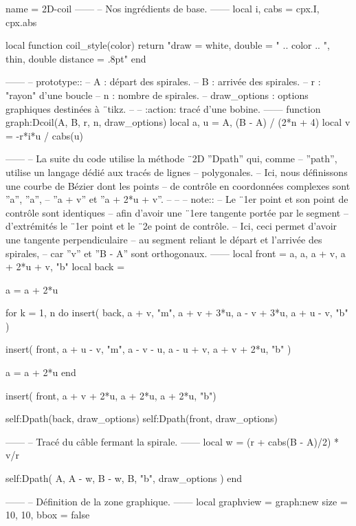 \documentclass[varwidth]{standalone}
\begin{document}
\begin{luadraw}{name = 2D-coil}
------
-- Nos ingrédients de base.
------
local i, cabs = cpx.I, cpx.abs

local function coil_style(color)
  return "draw = white, double = " .. color
      .. ", thin, double distance = .8pt"
end

------
-- prototype::
--     A            : départ des spirales.
--     B            : arrivée des spirales.
--     r            : "rayon" d'une boucle
--     n            : nombre de spirales.
--     draw_options : options graphiques destinées à ¨tikz.
--
--     :action: tracé d'une bobine.
------
function graph:Dcoil(A, B, r, n, draw_options)
  local a, u = A, (B - A) / (2*n + 4)
  local v    = -r*i*u / cabs(u)

------
-- La suite du code utilise la méthode ¨2D ''Dpath'' qui, comme
-- ''path'', utilise un langage dédié aux tracés de lignes
-- polygonales.
-- Ici, nous définissons une courbe de Bézier dont les points
-- de contrôle en coordonnées complexes sont ''a'', ''a'',
-- ''a + v'' et ''a + 2*u + v''.
--
--
-- note::
--     Le ¨1er point et son point de contrôle sont identiques
--     afin d'avoir une ¨1ere tangente portée par le segment
--     d'extrémités le ¨1er point et le ¨2e point de contrôle.
--     Ici, ceci permet d'avoir une tangente perpendiculaire
--     au segment reliant le départ et l'arrivée des spirales,
--     car ''v'' et ''B - A'' sont orthogonaux.
------
  local front = {a, a, a + v, a + 2*u + v, "b"}
  local back  = {}

  a = a + 2*u

  for k = 1, n do
    insert(
      back,
      {
        a + v, "m",
        a + v + 3*u, a - v + 3*u, a + u - v, "b"
      })

    insert(
      front,
      {
        a + u - v, "m",
        a - v - u, a - u + v, a + v + 2*u, "b"
      })

    a = a + 2*u
  end

  insert(
    front,
    {a + v + 2*u, a + 2*u, a + 2*u, "b"})

  self:Dpath(back, draw_options)
  self:Dpath(front, draw_options)

------
-- Tracé du câble fermant la spirale.
------
  local w = (r + cabs(B - A)/2) * v/r

  self:Dpath(
    {A, A - w, B - w, B, "b"},
    draw_options
  )
end

------
-- Définition de la zone graphique.
------
local graphview = graph:new{
  size = {10, 10},
  bbox = false
}


\end{luadraw}
\end{document}
